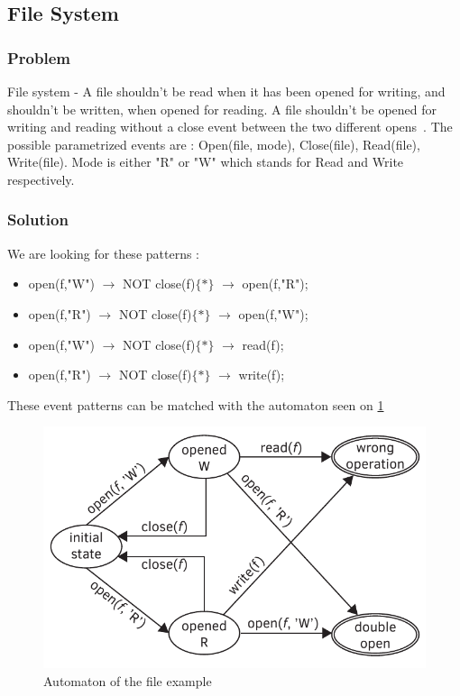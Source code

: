  
		\subsection{File System}
			\subsubsection{Problem}
				File system - A file shouldn't be read when it has been opened for writing, and shouldn't be written, when opened for reading. 
				A file shouldn't be opened for writing and reading without a close event between the two different opens~\citep{marq}.
				The possible parametrized events are : 
				Open(file, mode), 
				Close(file), 
				Read(file), 
				Write(file). 
				Mode is either "R" or "W" which stands for Read and Write respectively.
			\subsubsection{Solution}
				We are looking for these patterns :

				\begin{itemize}
					\item open(f,"W") $\rightarrow$ NOT close(f)$\{\ast\}$ $\rightarrow$ open(f,"R");
					\item open(f,"R") $\rightarrow$ NOT close(f)$\{\ast\}$ $\rightarrow$ open(f,"W");
					\item open(f,"W") $\rightarrow$ NOT close(f)$\{\ast\}$ $\rightarrow$ read(f);
					\item open(f,"R") $\rightarrow$ NOT close(f)$\{\ast\}$ $\rightarrow$ write(f);
				\end{itemize}

				These event patterns can be matched with the automaton seen on \cref{fig:cep:fileautomaton}
				
				\begin{figure}[h]
				\centering
				\includegraphics[width=0.7\linewidth]{include/figures/chapter_5/file_example_aut}
				\caption{Automaton of the file example}
				\label{fig:cep:fileautomaton}
				\end{figure}

